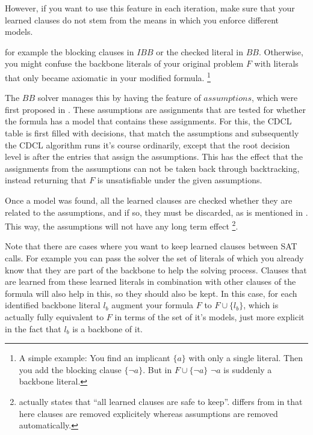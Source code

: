 
\iffalse

However, if you want to use this feature in each iteration, make sure that your learned clauses do not stem from the means in which you enforce different models.

 for example the blocking clauses in $IBB$ or the checked literal in $BB$. Otherwise, you might confuse the backbone literals of your original problem $F$ with literals that only became axiomatic in your modified formula. \footnote{A simple example: You find an implicant $\{a\}$ with only a single literal. Then you add the blocking clause $\{\neg a\}$. But in $F \cup \{\neg a\}$ $\neg a$ is suddenly a backbone literal.}

The $BB$ solver manages this by having the feature of $assumptions$, which were first proposed in \cite{ENSO03}. These assumptions are assignments that are tested for whether the formula has a model that contains these assignments. For this, the CDCL table is first filled with decisions, that match the assumptions and subsequently the CDCL algorithm runs it's course ordinarily, except that the root decision level is after the entries that assign the assumptions. This has the effect that the assignments from the assumptions can not be taken back through backtracking, instead returning that $F$ is unsatisfiable under the given assumptions.

Once a model was found, all the learned clauses are checked whether they are related to the assumptions, and if so, they must be discarded, as is mentioned in \cite{WKS01}. This way, the assumptions will not have any long term effect
\footnote{\cite{ENSO03} actually states that ``all learned clauses are safe to keep''. \cite{WKS01} differs from \cite{ENSO03} in that here clauses are removed explicitely whereas assumptions are removed automatically.}.


Note that there are cases where you want to keep learned clauses between SAT calls. For example you can pass the solver the set of literals of which you already know that they are part of the backbone to help the solving process. Clauses that are learned from these learned literals in combination with other clauses of the formula will also help in this, so they should also be kept. In this case, for each identified backbone literal $l_b$ augment your formula $F$ to $F \cup \{l_b\}$, which is actually fully equivalent to $F$ in terms of the set of it's models, just more explicit in the fact that $l_b$ is a backbone of it.


